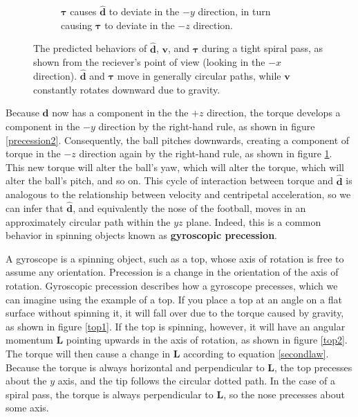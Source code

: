 \documentclass{article}
\begin{document}
\begin{figure}[h]
\begin{subfigure}[b]{0.3\textwidth}
         \caption{$\pmb{\tau}$ causes $\mathbf{\hat{d}}$ to deviate in the $-y$ direction, in turn causing $\pmb{\tau}$ to deviate in the $-z$ direction.}
         \label{precession3}
     \end{subfigure}
    \caption{The predicted behaviors of $\mathbf{\hat{d}}$, $\mathbf{v}$, and $\pmb{\tau}$ during a tight spiral pass, as shown from the reciever's point of view (looking in the $-x$ direction). $\mathbf{\hat{d}}$ and $\pmb{\tau}$ move in generally circular paths, while $\mathbf{v}$ constantly rotates downward due to gravity.}
    \label{precession}
\end{figure}

Because $\mathbf{\hat{d}}$ now has a component in the the $+z$ direction, the torque develops a component in the $-y$ direction by the right-hand rule, as shown in figure \ref{precession2}. Consequently, the ball pitches downwards, creating a component of torque in the $-z$ direction again by the right-hand rule, as shown in figure \ref{precession3}. This new torque will alter the ball's yaw, which will alter the torque, which will alter the ball's pitch, and so on. This cycle of interaction between torque and $\mathbf{\hat{d}}$ is analogous to the relationship between velocity and centripetal acceleration, so we can infer that $\mathbf{\hat{d}}$, and equivalently the nose of the football, moves in an approximately circular path within the $yz$ plane. Indeed, this is a common behavior in spinning objects known as \textbf{gyroscopic precession}.

A gyroscope is a spinning object, such as a top, whose axis of rotation is free to assume any orientation. Precession is a change in the orientation of the axis of rotation. Gyroscopic precession describes how a gyroscope precesses, which we can imagine using the example of a top. If you place a top at an angle on a flat surface without spinning it, it will fall over due to the torque caused by gravity, as shown in figure \ref{top1}. If the top is spinning, however, it will have an angular momentum $\mathbf{L}$ pointing upwards in the axis of rotation, as shown in figure \ref{top2}. The torque will then cause a change in $\mathbf{L}$ according to equation \ref{secondlaw}. Because the torque is always horizontal and perpendicular to $\mathbf{L}$, the top precesses about the $y$ axis, and the tip follows the circular dotted path. In the case of a spiral pass, the torque is always perpendicular to $\mathbf{L}$, so the nose precesses about some axis.
\end{document}
